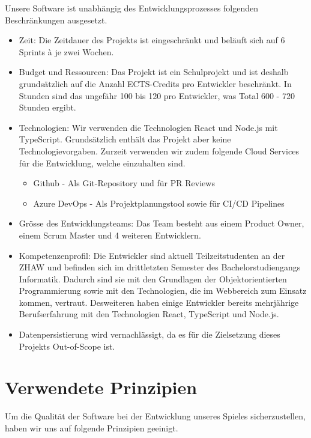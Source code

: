\documentclass[11pt,a4paper,german]{scrartcl}
\let\oldsection\section
\renewcommand\section{\clearpage\oldsection}
\begin{document}
Unsere Software ist unabhängig des Entwicklungsprozesses folgenden Beschränkungen ausgesetzt.
\begin{itemize}
  \item Zeit: Die Zeitdauer des Projekts ist eingeschränkt und beläuft sich auf 6 Sprints à je zwei Wochen.
  \item Budget und Ressourcen: Das Projekt ist ein Schulprojekt und ist deshalb grundsätzlich auf die Anzahl ECTS-Credits pro Entwickler beschränkt. In Stunden sind das ungefähr 100 bis 120 pro Entwickler, was Total 600 - 720 Stunden ergibt.
  \item Technologien: Wir verwenden die Technologien React und Node.js mit TypeScript. Grundsätzlich enthält das Projekt aber keine Technologievorgaben. Zurzeit verwenden wir zudem folgende Cloud Services für die Entwicklung, welche einzuhalten sind.
        \begin{itemize}
          \item Github - Als Git-Repository und für PR Reviews
          \item Azure DevOps - Als Projektplanungstool sowie für CI/CD Pipelines
        \end{itemize}
  \item Grösse des Entwicklungsteams: Das Team besteht aus einem Product Owner, einem Scrum Master und 4 weiteren Entwicklern.
  \item Kompetenzenprofil: Die Entwickler sind aktuell Teilzeitstudenten an der ZHAW und befinden sich im drittletzten Semester des Bachelorstudiengangs Informatik. Dadurch sind sie mit den Grundlagen der Objektorientierten Programmierung sowie mit den Technologien, die im Webbereich zum Einsatz kommen, vertraut. Desweiteren haben einige Entwickler bereits mehrjährige Berufserfahrung mit den Technologien React, TypeScript und Node.js.
  \item Datenpersistierung wird vernachlässigt, da es für die Zielsetzung dieses Projekts Out-of-Scope ist.
\end{itemize}

\section{Verwendete Prinzipien}
Um die Qualität der Software bei der Entwicklung unseres Spieles sicherzustellen, haben wir uns auf folgende Prinzipien geeinigt.
\end{document}

